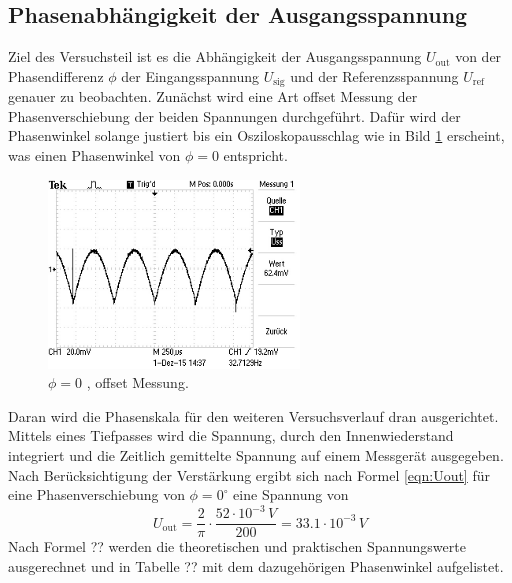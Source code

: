 \subsection{Phasenabhängigkeit der Ausgangsspannung}
Ziel des Versuchsteil ist es die Abhängigkeit der Ausgangsspannung $U_{\text{out}}$ von der Phasendifferenz $\phi$ der Eingangsspannung $U_{\text{sig}}$ und der Referenzsspannung $U_{\text{ref}}$ genauer zu beobachten. Zunächst wird eine Art offset Messung der Phasenverschiebung der beiden Spannungen durchgeführt. Dafür wird der Phasenwinkel solange justiert bis ein Osziloskopausschlag wie in Bild \ref{fig:phi0} erscheint, was einen Phasenwinkel von $\phi = 0$ entspricht.
\begin{figure}
  \centering
  \includegraphics[height=5cm]{picture/1.JPG}
  \caption{$\phi = 0$ , offset Messung.}
  \label{fig:phi0}
\end{figure}
Daran wird die Phasenskala für den weiteren Versuchsverlauf dran ausgerichtet. Mittels eines Tiefpasses wird die Spannung, durch den Innenwiederstand integriert und die Zeitlich gemittelte Spannung auf einem Messgerät ausgegeben. Nach Berücksichtigung der Verstärkung ergibt sich nach Formel \ref{eqn:Uout} für eine Phasenverschiebung von $\phi = 0^{\circ}$ eine Spannung von
\begin{equation}
  U_{\text{out}} = \frac{2}{\pi} \cdot \frac{52 \cdot 10^{-3} \, V}{200} = 33.1 \cdot 10^{-3} \, V
  \label{eqn:Uout}
\end{equation}
Nach Formel ?? werden die theoretischen und praktischen Spannungswerte ausgerechnet und in Tabelle ?? mit dem dazugehörigen Phasenwinkel aufgelistet.
